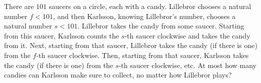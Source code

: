 \problem
There are $101$ saucers on a circle, each with a candy.
Lillebror chooses a natural number $f < 101$, and then Karlsson, knowing
Lillebror's number, chooses a natural number $s < 101$.
Lillebror takes the candy from some saucer.
Starting from this saucer, Karlsson counts the $s$-th saucer clockwise and
takes the candy from it.
Next, starting from that saucer, Lillebror takes the candy (if there is one)
from the $f$-th saucer clockwise.
Then, starting from that saucer, Karlsson takes the candy (if there is one)
from the $s$-th saucer clockwise, etc.
At most how many candies can Karlsson make sure to collect, no matter how
Lillebror plays?
\solution
\endproblem
